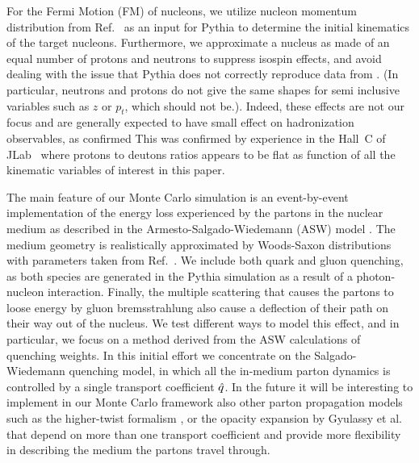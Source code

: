 For the Fermi Motion (FM) of nucleons, we utilize nucleon momentum distribution from Ref.~\cite{CiofidegliAtti:1995qe} as an input for Pythia to determine the initial kinematics of the target nucleons. Furthermore, 
we approximate a nucleus as made of an equal number of protons and neutrons to suppress isospin effects, and avoid dealing with the issue that Pythia does not correctly reproduce data from \cite{Asaturyan:2011mq}. (In particular, neutrons and protons do not give the same shapes for semi inclusive variables such as $z$ or $p_t$, which should not be.). Indeed, these effects are not our focus and are generally expected to have small effect on hadronization observables, as confirmed  This was confirmed by experience in the Hall~C of JLab~\cite{Asaturyan:2011mq} where protons to deutons ratios appears to be flat as function of all the kinematic variables of interest in this paper.  

The main feature of our Monte Carlo simulation is an event-by-event implementation of the energy loss experienced by the partons in the nuclear medium as described in the Armesto-Salgado-Wiedemann (ASW) model \cite{Salgado:2002cd,Salgado:2003gb,Armesto:2003jh}. The medium geometry is realistically approximated by Woods-Saxon distributions with parameters taken from Ref.~\cite{DeJager:1987qc}. We include both quark and gluon quenching, as both species are generated in the Pythia simulation as a result of a photon-nucleon interaction. Finally, the multiple scattering that causes the partons to loose energy by gluon bremsstrahlung also cause a deflection of their path on their way out of the nucleus. We test different ways to model this effect, and in particular, we focus on a method derived from the ASW calculations of quenching weights. In this initial effort we concentrate on the Salgado-Wiedemann quenching model, in which all the in-medium parton dynamics is controlled by a single transport coefficient ${\hat q}$. In the future it will be interesting to implement in our Monte Carlo framework also other parton propagation models such as the higher-twist formalism \cite{HT,majumder}, or the opacity expansion by Gyulassy et al. \cite{Gyulassy:1999zd,Djordjevic:2003zk} that depend on more than one transport coefficient and provide more flexibility in describing the medium the partons travel through.

